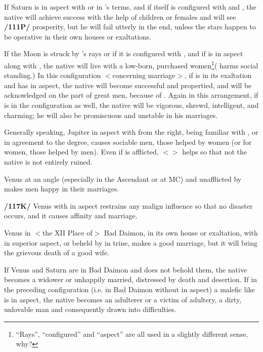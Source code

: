 If Saturn is in aspect with \Venus\xspace or in \Venus’s terms, and if \Venus\xspace itself is configured with \Jupiter\xspace and \Mars, the native will achieve success with the help of children or females and will see \textbf{/111P/} prosperity, but  he will fail utterly in the end, unless the stars happen to be operative in their own houses or
exaltations. 

If  the Moon is struck by \Jupiter’s rays or if it is configured with \Jupiter, and if \Saturn\xspace is in aspect along with \Jupiter, the native will live with a low-born, purchased women\footnote{``Rays'', ``configured'' and ``aspect'' are all used in a slightly different sense, why?}(\Saturn\xspace harms social standing.) In this configuration $<$concerning marriage$>$, if \Venus\xspace is in its exaltation and has \Jupiter\xspace in aspect, the native will become successful and propertied, and will be acknowledged on the part of great men, because of \Venus. Again in this arrangement, if \Mercury\xspace is in the configuration as well, the native will be vigorous, shrewd, intelligent, and charming; he will also be promiscuous and unstable in his marriages. 

Generally speaking, Jupiter in aspect with \Venus\xspace from the right, being familiar with \Venus, or in agreement to the degree, causes sociable men, those helped by women (or for women, those helped by men). Even if \Venus\xspace is afflicted, $<$\Jupiter$>$ helps so that not the native is not entirely ruined.

Venus at an angle (especially in the Ascendant or at MC) and unafflicted by \Saturn\xspace makes men happy
in their marriages. 

\textbf{/117K/} Venus with \Jupiter\xspace in aspect restrains any malign influence so that no disaster occurs, and it causes affinity and marriage. 

Venus in $<$the XII Place of$>$ Bad Daimon, in its own house or exaltation, with \Jupiter\xspace in superior aspect, or beheld by \Jupiter\xspace in trine, makes a good marriage, but it will bring the grievous death of a good wife. 

If Venus and Saturn are in Bad Daimon and \Jupiter\xspace does not behold them, the native becomes a widower or unhappily married, distressed by death and desertion. If in the preceding configuration (i.e. \Venus\xspace in Bad Daimon without \Jupiter\xspace in aspect) a malefic like \Mars\xspace is in aspect, the native becomes an adulterer or a victim of adultery, a dirty, unlovable man and consequently drawn into difficulties. 

